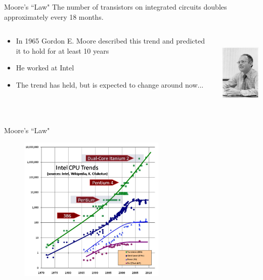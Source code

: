 \documentclass[xcolor=x11names,compress]{beamer}
\renewcommand{\(}{\begin{columns}}
\renewcommand{\)}{\end{columns}}
\newcommand{\<}[1]{\begin{column}{#1}}
\renewcommand{\>}{\end{column}}
\begin{document}
\begin{frame}{Moore's ``Law"}
The number of transistors on integrated circuits doubles approximately every 18 months. 

\begin{columns}
  \begin{column}{0.7\textwidth}
\begin{itemize}
\item In 1965 Gordon E. Moore described this trend and predicted it to hold for at least 10 years\vspace*{0.5 em}
\item He worked at Intel\vspace*{0.5 em}
\item The trend has held, but is expected to change around now...
\end{itemize}
  \end{column}
  \begin{column}{0.3\textwidth}
    \includegraphics[height=1.5in,clip]{GordonMoore1975}
  \end{column}
\end{columns}
\end{frame}

\begin{frame}{Moore's ``Law"}

\begin{figure}
\includegraphics[height=2.75in,clip]{CPU-Scaling}
\end{figure}

\end{frame}
\end{document}
